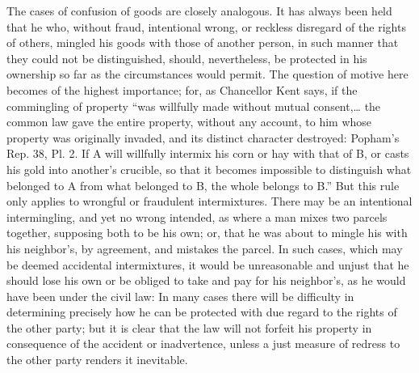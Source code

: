 The cases of confusion of goods are closely analogous. It has always been held
that he who, without fraud, intentional wrong, or reckless disregard of the
rights of others, mingled his goods with those of another person, in such
manner that they could not be distinguished, should, nevertheless, be protected
in his ownership so far as the circumstances would permit. The question of
motive here becomes of the highest importance; for, as Chancellor Kent says, if
the commingling of property ``was willfully made without mutual consent,\ldots
the common law gave the entire property, without any account, to him whose
property was originally invaded, and its distinct character destroyed: Popham's
Rep. 38, Pl. 2. If A will willfully intermix his corn or hay with that of B, or
casts his gold into another's crucible, so that it becomes impossible to
distinguish what belonged to A from what belonged to B, the whole belongs to
B.'' 
But this rule only applies to wrongful or fraudulent intermixtures. There may
be an intentional intermingling, and yet no wrong intended, as where a man
mixes two parcels together, supposing both to be his own; or, that he was about
to mingle his with his neighbor's, by agreement, and mistakes the parcel. In
such cases, which may be deemed accidental intermixtures, it would be
unreasonable and unjust that he should lose his own or be obliged to take and
pay for his neighbor's, as he would have been under the civil law: In many
cases there will be difficulty in determining precisely how he can be protected
with due regard to the rights of the other party; but it is clear that the law
will not forfeit his property in consequence of the accident or inadvertence,
unless a just measure of redress to the other party renders it inevitable. 

